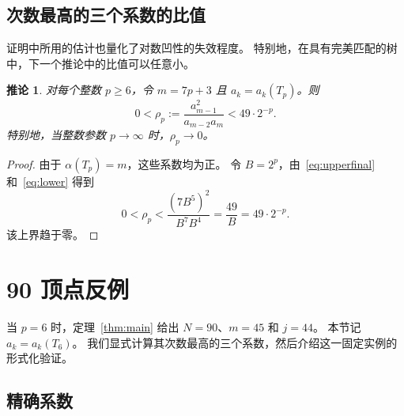 \documentclass[UTF8,11pt,a4paper,fontset=fandol]{ctexart}
\newtheorem{corollary}[theorem]{推论}
\theoremstyle{remark}
\numberwithin{equation}{section}
\begin{document}
\subsection{次数最高的三个系数的比值}\label{sec:ratio}

证明中所用的估计也量化了对数凹性的失效程度。
特别地，在具有完美匹配的树中，下一个推论中的比值可以任意小。

\begin{corollary}\label{cor:ratio}
对每个整数 $p\geq6$，令 $m=7p+3$ 且 $a_k=a_k(T_p)$。则
\begin{equation}\label{eq:ratio-bound}
 0<\rho_p:=\frac{a_{m-1}^2}{a_{m-2}a_m}<49\cdot2^{-p}.
\end{equation}
特别地，当整数参数 $p\to\infty$ 时，$\rho_p\to0$。
\end{corollary}

\begin{proof}
由于 $\alpha(T_p)=m$，这些系数均为正。
令 $B=2^p$，由~\eqref{eq:upperfinal} 和~\eqref{eq:lower} 得到
\[
 0<\rho_p<\frac{(7B^5)^2}{B^7B^4}=\frac{49}{B}=49\cdot2^{-p}.
\]
该上界趋于零。
\end{proof}

\section{90 顶点反例}\label{sec:formalization}

当 $p=6$ 时，定理~\ref{thm:main} 给出 $N=90$、$m=45$ 和 $j=44$。
本节记 $a_k=a_k(T_6)$。
我们显式计算其次数最高的三个系数，然后介绍这一固定实例的形式化验证。

\subsection{精确系数}
\end{document}
